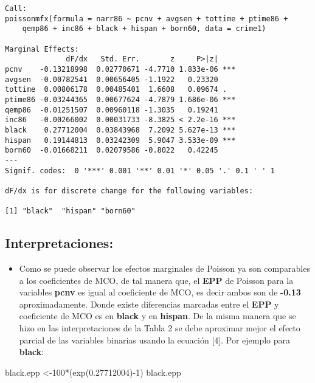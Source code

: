 \documentclass[
  letterpaper,
  DIV=11,
  numbers=noendperiod]{scrreprt}
\newenvironment{Shaded}{\begin{snugshade}}{\end{snugshade}}
\newcommand{\DecValTok}[1]{\textcolor[rgb]{0.68,0.00,0.00}{#1}}
\newcommand{\FloatTok}[1]{\textcolor[rgb]{0.68,0.00,0.00}{#1}}
\newcommand{\FunctionTok}[1]{\textcolor[rgb]{0.28,0.35,0.67}{#1}}
\newcommand{\NormalTok}[1]{\textcolor[rgb]{0.00,0.23,0.31}{#1}}
\newcommand{\OtherTok}[1]{\textcolor[rgb]{0.00,0.23,0.31}{#1}}
\newcommand{\SpecialCharTok}[1]{\textcolor[rgb]{0.37,0.37,0.37}{#1}}
\providecommand{\tightlist}{%
  \setlength{\itemsep}{0pt}\setlength{\parskip}{0pt}}\usepackage{longtable,booktabs,array}
\begin{document}
\begin{verbatim}
Call:
poissonmfx(formula = narr86 ~ pcnv + avgsen + tottime + ptime86 + 
    qemp86 + inc86 + black + hispan + born60, data = crime1)

Marginal Effects:
              dF/dx   Std. Err.       z     P>|z|    
pcnv    -0.13218998  0.02770671 -4.7710 1.833e-06 ***
avgsen  -0.00782541  0.00656405 -1.1922   0.23320    
tottime  0.00806178  0.00485401  1.6608   0.09674 .  
ptime86 -0.03244365  0.00677624 -4.7879 1.686e-06 ***
qemp86  -0.01251507  0.00960118 -1.3035   0.19241    
inc86   -0.00266002  0.00031733 -8.3825 < 2.2e-16 ***
black    0.27712004  0.03843968  7.2092 5.627e-13 ***
hispan   0.19144813  0.03242309  5.9047 3.533e-09 ***
born60  -0.01668211  0.02079586 -0.8022   0.42245    
---
Signif. codes:  0 '***' 0.001 '**' 0.01 '*' 0.05 '.' 0.1 ' ' 1

dF/dx is for discrete change for the following variables:

[1] "black"  "hispan" "born60"
\end{verbatim}

\subsection{Interpretaciones:}\label{interpretaciones-2}

\begin{itemize}
\tightlist
\item
  Como se puede observar los efectos marginales de Poisson ya son
  comparables a los coeficientes de MCO, de tal manera que, el
  \textbf{EPP} de Poisson para la variables \textbf{pcnv} es igual al
  coeficiente de MCO, es decir ambos son de \textbf{-0.13}
  aproximadamente. Donde existe diferencias marcadas entre el
  \textbf{EPP} y coeficiente de MCO es en \textbf{black} y en
  \textbf{hispan}. De la misma manera que se hizo en las
  interpretaciones de la Tabla 2 se debe aproximar mejor el efecto
  parcial de las variables binarias usando la ecuación {[}4{]}. Por
  ejemplo para \textbf{black}:
\end{itemize}

\begin{Shaded}
\begin{Highlighting}[]
\NormalTok{black.epp }\OtherTok{\textless{}{-}}\DecValTok{100}\SpecialCharTok{*}\NormalTok{(}\FunctionTok{exp}\NormalTok{(}\FloatTok{0.27712004}\NormalTok{)}\SpecialCharTok{{-}}\DecValTok{1}\NormalTok{)}
\NormalTok{black.epp}
\end{Highlighting}
\end{Shaded}
\end{document}
